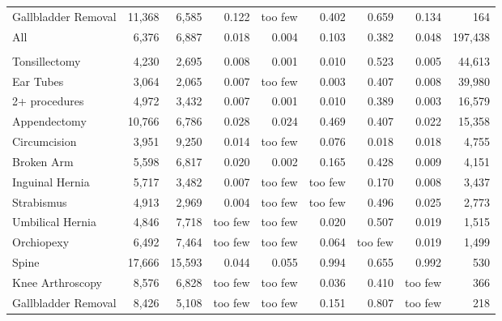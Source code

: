 \begin{table}[H]
\begin{tabular}{lrrrrrrrr}
\hspace{1em}Gallbladder Removal & 11,368 & 6,585 & 0.122 & too few & 0.402 & 0.659 & 0.134 & 164\\
\hspace{1em}All & 6,376 & 6,887 & 0.018 & 0.004 & 0.103 & 0.382 & 0.048 & 197,438\\
\addlinespace[0.3em]
\multicolumn{9}{l}{\textbf{Non-Children's Hospitals}}\\
\hspace{1em}Tonsillectomy & 4,230 & 2,695 & 0.008 & 0.001 & 0.010 & 0.523 & 0.005 & 44,613\\
\hspace{1em}Ear Tubes & 3,064 & 2,065 & 0.007 & too few & 0.003 & 0.407 & 0.008 & 39,980\\
\hspace{1em}2+ procedures & 4,972 & 3,432 & 0.007 & 0.001 & 0.010 & 0.389 & 0.003 & 16,579\\
\hspace{1em}Appendectomy & 10,766 & 6,786 & 0.028 & 0.024 & 0.469 & 0.407 & 0.022 & 15,358\\
\hspace{1em}Circumcision & 3,951 & 9,250 & 0.014 & too few & 0.076 & 0.018 & 0.018 & 4,755\\
\hspace{1em}Broken Arm & 5,598 & 6,817 & 0.020 & 0.002 & 0.165 & 0.428 & 0.009 & 4,151\\
\hspace{1em}Inguinal Hernia & 5,717 & 3,482 & 0.007 & too few & too few & 0.170 & 0.008 & 3,437\\
\hspace{1em}Strabismus & 4,913 & 2,969 & 0.004 & too few & too few & 0.496 & 0.025 & 2,773\\
\hspace{1em}Umbilical Hernia & 4,846 & 7,718 & too few & too few & 0.020 & 0.507 & 0.019 & 1,515\\
\hspace{1em}Orchiopexy & 6,492 & 7,464 & too few & too few & 0.064 & too few & 0.019 & 1,499\\
\hspace{1em}Spine & 17,666 & 15,593 & 0.044 & 0.055 & 0.994 & 0.655 & 0.992 & 530\\
\hspace{1em}Knee Arthroscopy & 8,576 & 6,828 & too few & too few & 0.036 & 0.410 & too few & 366\\
\hspace{1em}Gallbladder Removal & 8,426 & 5,108 & too few & too few & 0.151 & 0.807 & too few & 218\\

\end{tabular}
\end{table}
